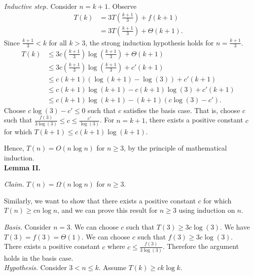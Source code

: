 \begin{enumerate}
\textit{Inductive step. }Consider $n=k+1$. Observe
\begin{align*}
T(k)&=3T\left(\frac{k+1}{3}\right)+f(k+1)\\
&=3T\left(\frac{k+1}{3}\right)+\Theta(k+1).
\end{align*}
Since $\frac{k+1}{3}<k$ for all $k>3$, the strong induction hypothesis holds for $n=\frac{k+1}{3}$.
\begin{align*}
T(k)&\leq 3c\left(\frac{k+1}{3}\right)\log\left(\frac{k+1}{3}\right)+\Theta(k+1)\\
&\leq 3c\left(\frac{k+1}{3}\right)\log\left(\frac{k+1}{3}\right)+c'(k+1)\\
&\leq c(k+1)(\log(k+1)-\log(3))+c'(k+1)\\
&\leq c(k+1)\log(k+1)-c(k+1)\log(3)+c'(k+1)\\
&\leq c(k+1)\log(k+1)-(k+1)(c\log(3)-c').
\end{align*}
Choose $c\log(3)-c'\leq 0$ such that $c$ satisfies the basis case. That is, choose $c$ such that $\frac{f(3)}{3\log(3)}\leq c\leq\frac{c'}{\log(3)}$. For $n=k+1$, there exists a positive constant $c$ for which $T(k+1)\leq c(k+1)\log(k+1)$. 

Hence, $T(n)=O(n\log n)$ for $n\geq 3$, by the principle of mathematical induction.\\

\textbf{Lemma II. }

\textit{Claim. }$T(n)=\Omega(n\log n)$ for $n\geq 3$.

Similarly, we want to show that there exists a positive constant $c$ for which $T(n)\geq cn\log n$, and we can prove this result for $n\geq 3$ using induction on $n$.

\textit{Basis. }Consider $n=3$. We can choose $c$ such that $T(3)\geq 3c\log(3)$. We have $T(3)=f(3)=\Theta(1)$. We can choose $c$ such that $f(3)\geq 3c\log(3)$. There exists a positive constant $c$ where $c\leq\frac{f(3)}{3\log(3)}$. Therefore the argument holds in the basis case.\\

\textit{Hypothesis. }Consider $3<n\leq k$. Assume $T(k)\geq ck\log k$.\\


\end{enumerate}

